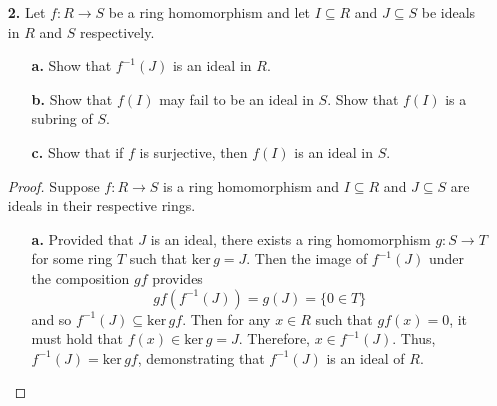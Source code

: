 \documentclass[ 12pt ]{article}
\begin{document}
\begin{enumerate}
\begin{proof}
\begin{enumerate}
				\item[\textbf{b.}] Suppose $a + N \in R/N$ is nilpotent. Let $n \in \mathbb{N}$ be a natural such that $(a + N)^n = 0 + N = N$, the zero of $R/N$. By definition of the quotient ring, it follows that $$a^n + N = (a + N)^n = 0 + N$$ and so $a^n = a^n - 0 \in N$. Furthermore, $a^n$ is nilpotent in $R$. Then there exists a $m \in \mathbb{N}$ such that $$a^{mn} = (a^n)^m = 0 \in R;$$ consequently, $a$ is nilpotent by definition. Hence, $a - 0 = a \in N$ allowing us to conclude that $$a + N = 0 + N = N.$$
			\end{enumerate}
		\end{proof}


	\item[\textbf{2.}] Let $f : R \to S$ be a ring homomorphism and let $I \subseteq R$ and $J \subseteq S$ be ideals in $R$ and $S$ respectively.
	\begin{enumerate}
		\item[\textbf{a.}] Show that $f^{-1}(J)$ is an ideal in $R$.
		\item[\textbf{b.}] Show that $f(I)$ may fail to be an ideal in $S$. Show that $f(I)$ is a subring of $S$.
		\item[\textbf{c.}] Show that if $f$ is surjective, then $f(I)$ is an ideal in $S$.
	\end{enumerate}

		\begin{proof}
			Suppose $f : R \to S$ is a ring homomorphism and $I \subseteq R$ and $J \subseteq S$ are ideals in their respective rings.
			\begin{enumerate}
				\item[\textbf{a.}] Provided that $J$ is an ideal, there exists a ring homomorphism $g : S \to T$ for some ring $T$ such that $\mathrm{ker}\, g = J$. Then the image of $f^{-1}(J)$ under the composition $gf$ provides $$gf( f^{-1}(J) ) = g(J) = \{ 0 \in T \}$$ and so $f^{-1}(J) \subseteq \mathrm{ker}\, gf$. Then for any $x \in R$ such that $gf(x) = 0$, it must hold that $f(x) \in \mathrm{ker}\, g = J$. Therefore, $x \in f^{-1}(J)$. Thus, $f^{-1}(J) = \mathrm{ker}\, gf$, demonstrating that $f^{-1}(J)$ is an ideal of $R$.


\end{enumerate}
\end{proof}
\end{enumerate}
\end{document}
